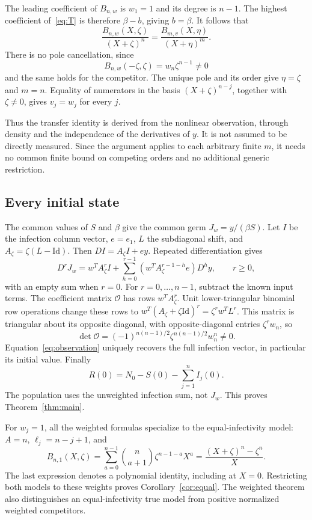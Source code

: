 \documentclass[11pt]{article}
\theoremstyle{remark}\newtheorem{remark}[theorem]{Remark}
\begin{document}
The leading coefficient of $B_{n,w}$ is $w_1=1$ and its degree is $n-1$. The highest coefficient of~\eqref{eq:T} is therefore $\beta-b$, giving $b=\beta$. It follows that
\begin{equation}\label{eq:transfer}
 \frac{B_{n,w}(X,\zeta)}{(X+\zeta)^n}
   =\frac{B_{m,v}(X,\eta)}{(X+\eta)^m}.
\end{equation}
There is no pole cancellation, since
\[
 B_{n,w}(-\zeta,\zeta)=w_n\zeta^{n-1}\ne0
\]
and the same holds for the competitor. The unique pole and its order give $\eta=\zeta$ and $m=n$. Equality of numerators in the basis $(X+\zeta)^{n-j}$, together with $\zeta\ne0$, gives $v_j=w_j$ for every $j$.

Thus the transfer identity is derived from the nonlinear observation, through density and the independence of the derivatives of $y$. It is not assumed to be directly measured. Since the argument applies to each arbitrary finite $m$, it needs no common finite bound on competing orders and no additional generic restriction.

\subsection{Every initial state}
The common values of $S$ and $\beta$ give the common germ $J_w=y/(\beta S)$. Let $I$ be the infection column vector, $e=e_1$, $L$ the subdiagonal shift, and $A_\zeta=\zeta(L-\mathrm{Id})$. Then $DI=A_\zeta I+ey$. Repeated differentiation gives
\begin{equation}\label{eq:observation}
 D^rJ_w=w^TA_\zeta^r I+
 \sum_{h=0}^{r-1}(w^TA_\zeta^{r-1-h}e)D^h y,
 \qquad r\geq0,
\end{equation}
with an empty sum when $r=0$. For $r=0,\ldots,n-1$, subtract the known input terms. The coefficient matrix $\mathcal O$ has rows $w^TA_\zeta^r$. Unit lower-triangular binomial row operations change these rows to $w^T(A_\zeta+\zeta\mathrm{Id})^r=\zeta^r w^TL^r$. This matrix is triangular about its opposite diagonal, with opposite-diagonal entries $\zeta^r w_n$, so
\begin{equation}\label{eq:obsdet}
 \det\mathcal O=(-1)^{n(n-1)/2}\zeta^{n(n-1)/2}w_n^n\ne0.
\end{equation}
Equation~\eqref{eq:observation} uniquely recovers the full infection vector, in particular its initial value. Finally
\[
 R(0)=N_0-S(0)-\sum_{j=1}^n I_j(0).
\]
The population uses the unweighted infection sum, not $J_w$. This proves Theorem~\ref{thm:main}.

For $w_j=1$, all the weighted formulas specialize to the equal-infectivity model: $A=n$, $\ell_j=n-j+1$, and
\begin{equation}\label{eq:equalB}
 B_{n,1}(X,\zeta)
 =\sum_{a=0}^{n-1}\binom n{a+1}\zeta^{n-1-a}X^a
 =\frac{(X+\zeta)^n-\zeta^n}{X}.
\end{equation}
The last expression denotes a polynomial identity, including at $X=0$. Restricting both models to these weights proves Corollary~\ref{cor:equal}. The weighted theorem also distinguishes an equal-infectivity true model from positive normalized weighted competitors.
\end{document}
